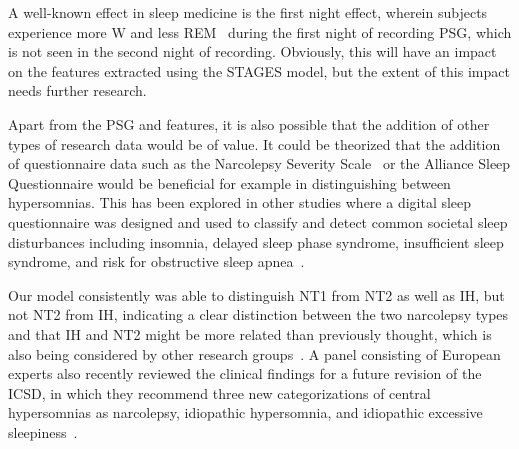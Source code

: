 A well-known effect in sleep medicine is the first night effect, wherein subjects experience more \ac{W} and less \ac{REM}~\cite{Agnew1966} during the first night of recording \ac{PSG}, which is not seen in the second night of recording.
Obviously, this will have an impact on the features extracted using the \ac{STAGES} model, but the extent of this impact needs further research.

Apart from the \ac{PSG} and \hla features, it is also possible that the addition of other types of research data would be of value.
It could be theorized that the addition of questionnaire data such as the Narcolepsy Severity Scale~\cite{Dauvilliers2020} or the Alliance Sleep Questionnaire would be beneficial for example in distinguishing between hypersomnias. 
This has been explored in other studies where \eg a digital sleep questionnaire was designed and used to classify and detect common societal sleep disturbances including insomnia, delayed sleep phase syndrome, insufficient sleep syndrome, and risk for obstructive sleep apnea~\cite{Schwartz2020}.




Our model consistently was able to distinguish \ac{NT1} from \ac{NT2} as well as IH, but not \ac{NT2} from IH, indicating a clear distinction between the two narcolepsy types and that IH and \ac{NT2} might be more related than previously thought, which is also being considered by other research groups~\cite{Fronczek2020}.
A panel consisting of European experts also recently reviewed the clinical findings for a future revision of the \ac{ICSD}, in which they recommend three new categorizations of central hypersomnias as narcolepsy, idiopathic hypersomnia, and idiopathic excessive sleepiness~\cite{Lammers2020}.

